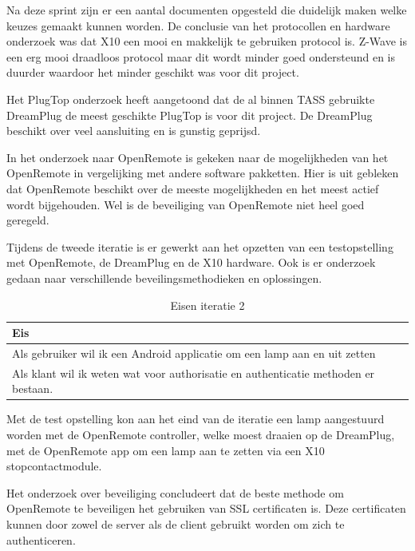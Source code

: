 \documentclass{article}
\begin{document}
Na deze sprint zijn er een aantal documenten opgesteld die duidelijk maken
welke keuzes gemaakt kunnen worden. De conclusie van het protocollen en
hardware onderzoek was dat X10 een mooi en makkelijk te gebruiken protocol
is. Z-Wave is een erg mooi draadloos protocol maar dit wordt minder goed
ondersteund en is duurder waardoor het minder geschikt was voor dit
project.

Het PlugTop onderzoek heeft aangetoond dat de al binnen TASS gebruikte
DreamPlug de meest geschikte PlugTop is voor dit project. De DreamPlug
beschikt over veel aansluiting en is gunstig geprijsd.

In het onderzoek naar OpenRemote is gekeken naar de mogelijkheden van het
OpenRemote in vergelijking met andere software pakketten. Hier is uit
gebleken dat OpenRemote beschikt over de meeste mogelijkheden en het meest
actief wordt bijgehouden. Wel is de beveiliging van OpenRemote niet heel
goed geregeld.

Tijdens de tweede iteratie is er gewerkt aan het opzetten van een
testopstelling met OpenRemote, de DreamPlug en de X10 hardware. Ook is er
onderzoek gedaan naar verschillende beveilingsmethodieken en oplossingen.

\begin{table}[h!]
  \caption{Eisen iteratie 2}
  \begin{center}
    \begin{tabular}{|| l ||}\hline
        Eis                                                                               \\\hline\hline
        Als gebruiker wil ik een Android applicatie om een lamp aan en uit zetten         \\\hline
        Als klant wil ik weten wat voor authorisatie en authenticatie methoden er bestaan.\\\hline
    \end{tabular}
  \end{center}
\end{table}

Met de test opstelling kon aan het eind van de iteratie een lamp
aangestuurd worden met de OpenRemote controller, welke moest draaien op de
DreamPlug, met de OpenRemote app om een lamp aan te zetten via een X10
stopcontactmodule.

Het onderzoek over beveiliging concludeert dat de beste methode om
OpenRemote te beveiligen het gebruiken van SSL certificaten is. Deze
certificaten kunnen door zowel de server als de client gebruikt worden om
zich te authenticeren.
\end{document}
